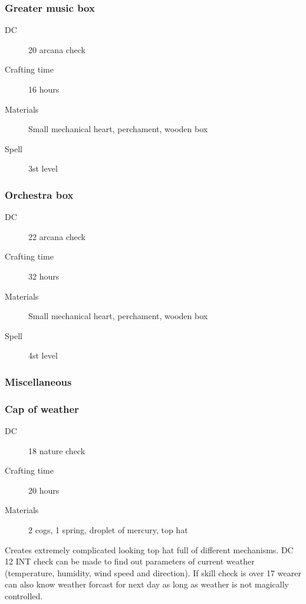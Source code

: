 \subsubsection{Greater music box}

\begin{description}
\item [DC] 20 arcana check
\item [Crafting time] 16 hours
\item [Materials] Small mechanical heart, perchament, wooden box
\item [Spell] 3st level
\end{description}

\subsubsection{Orchestra box}

\begin{description}
\item [DC] 22 arcana check
\item [Crafting time] 32 hours
\item [Materials] Small mechanical heart, perchament, wooden box
\item [Spell] 4st level
\end{description}

\subsubsection{Miscellaneous}

\subsubsection{Cap of weather}

\begin{description}
\item [DC] 18 nature check
\item [Crafting time] 20 hours
\item [Materials] 2 cogs, 1 spring, droplet of mercury, top hat
\end{description}

Creates extremely complicated looking top hat full of different mechanisms. DC 12 INT check can be made to find out parameters of current weather (temperature, humidity, wind speed and direction). If skill check is over 17 wearer can also know weather forcast for next day as long as weather is not magically controlled.

